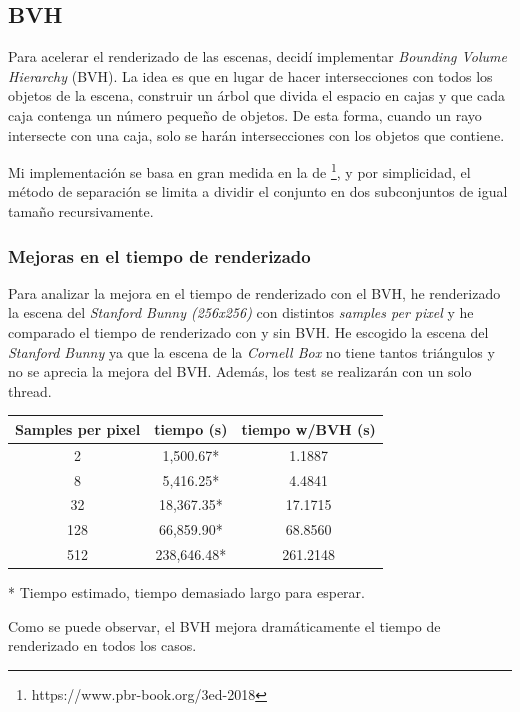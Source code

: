 \documentclass{article}
\begin{document}
\subsection{BVH}
Para acelerar el renderizado de las escenas, decidí implementar \textit{Bounding
  Volume Hierarchy} (BVH). La idea es que en lugar de hacer intersecciones con
todos los objetos de la escena, construir un árbol que divida el espacio en
cajas y que cada caja contenga un número pequeño de objetos. De esta forma,
cuando un rayo intersecte con una caja, solo se harán intersecciones con los
objetos que contiene.

Mi implementación se basa en gran medida en la de
\cite{PBRT3e}\footnote{https://www.pbr-book.org/3ed-2018},
y por simplicidad, el método de separación se limita a dividir el conjunto en dos
subconjuntos de igual tamaño recursivamente.

\subsubsection{Mejoras en el tiempo de renderizado}

Para analizar la mejora en el tiempo de renderizado con el BVH, he renderizado
la escena del \textit{Stanford Bunny (256x256)} con distintos \textit{samples
  per pixel} y he comparado el tiempo de renderizado con y sin BVH. He escogido
la escena del \textit{Stanford Bunny} ya que la escena de la \textit{Cornell
  Box} no tiene tantos triángulos y no se aprecia la mejora del BVH. Además, los
test se realizarán con un solo thread.

\begin{center}
\begin{tabular}{||c c c||}
 \hline
 Samples per pixel & tiempo (s) & tiempo w/BVH (s) \\ [0.5ex]
 \hline\hline
 2 & 1,500.67* & 1.1887 \\
 \hline
 8 & 5,416.25* & 4.4841 \\
 \hline
 32 & 18,367.35* & 17.1715 \\
 \hline
 128 & 66,859.90* & 68.8560 \\
 \hline
 512 & 238,646.48* & 261.2148 \\ [1ex]
 \hline
\end{tabular}
\end{center}

* Tiempo estimado, tiempo demasiado largo para esperar.

Como se puede observar, el BVH mejora dramáticamente el tiempo de renderizado en
todos los casos.
\end{document}

